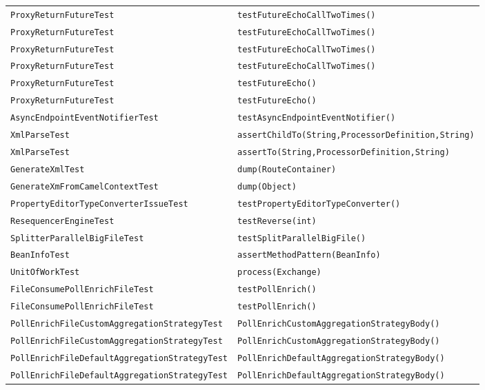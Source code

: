 \begin{center}
\begin{longtable}{ll}
\lstinline/ProxyReturnFutureTest/&{\lstinline/testFutureEchoCallTwoTimes()/}\\
\lstinline/ProxyReturnFutureTest/&{\lstinline/testFutureEchoCallTwoTimes()/}\\
\lstinline/ProxyReturnFutureTest/&{\lstinline/testFutureEchoCallTwoTimes()/}\\
\lstinline/ProxyReturnFutureTest/&{\lstinline/testFutureEchoCallTwoTimes()/}\\
\lstinline/ProxyReturnFutureTest/&{\lstinline/testFutureEcho()/}\\
\lstinline/ProxyReturnFutureTest/&{\lstinline/testFutureEcho()/}\\
\lstinline/AsyncEndpointEventNotifierTest/&{\lstinline/testAsyncEndpointEventNotifier()/}\\
\lstinline/XmlParseTest/&{\lstinline/assertChildTo(String,ProcessorDefinition,String)/}\\
\lstinline/XmlParseTest/&{\lstinline/assertTo(String,ProcessorDefinition,String)/}\\
\lstinline/GenerateXmlTest/&{\lstinline/dump(RouteContainer)/}\\
\lstinline/GenerateXmFromCamelContextTest/&{\lstinline/dump(Object)/}\\
\lstinline/PropertyEditorTypeConverterIssueTest/&{\lstinline/testPropertyEditorTypeConverter()/}\\
\lstinline/ResequencerEngineTest/&{\lstinline/testReverse(int)/}\\
\lstinline/SplitterParallelBigFileTest/&{\lstinline/testSplitParallelBigFile()/}\\
\lstinline/BeanInfoTest/&{\lstinline/assertMethodPattern(BeanInfo)/}\\
\lstinline/UnitOfWorkTest/&{\lstinline/process(Exchange)/}\\
\lstinline/FileConsumePollEnrichFileTest/&{\lstinline/testPollEnrich()/}\\
\lstinline/FileConsumePollEnrichFileTest/&{\lstinline/testPollEnrich()/}\\
\lstinline/PollEnrichFileCustomAggregationStrategyTest/&{\lstinline/PollEnrichCustomAggregationStrategyBody()/}\\
\lstinline/PollEnrichFileCustomAggregationStrategyTest/&{\lstinline/PollEnrichCustomAggregationStrategyBody()/}\\
\lstinline/PollEnrichFileDefaultAggregationStrategyTest/&{\lstinline/PollEnrichDefaultAggregationStrategyBody()/}\\
\lstinline/PollEnrichFileDefaultAggregationStrategyTest/&{\lstinline/PollEnrichDefaultAggregationStrategyBody()/}\\

\end{longtable}
\end{center}
